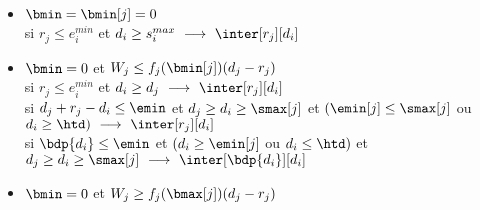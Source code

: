 \documentclass{report}
\begin{document}
\begin{itemize}
\item $\bmin = \bmin[j] = 0$\\

 si $r_j \le e_i^{min}$ et $d_i \ge s_i^{max}\ \longrightarrow\ \inter[r_j][d_i]$\\
 
\item $\bmin=0$ et $W_j \le f_j(\bmin[j])(d_j-r_j)$\\
si $r_j \le e_i^{min}$ et $d_i \ge d_j\ \longrightarrow\ \inter[r_j][d_i]$\\
si $d_j+r_j-d_i \le \emin$ et $d_j \ge d_i \ge \smax[j]$ et $(\emin[j] \le \smax[j]$ ou $d_i \ge \htd)\ \longrightarrow\ \inter[r_j][d_i]$\\
si $\bdp{d_i} \le \emin$ et $(d_i \ge \emin[j]$ ou $d_i \le \htd)$ et $d_j \ge d_i \ge \smax[j]\ \longrightarrow\ \inter[\bdp{d_i}][d_i]$\\


\item $\bmin=0$ et $W_j \ge f_j(\bmax[j])(d_j-r_j)$\\
 



\end{itemize}
\end{document}
